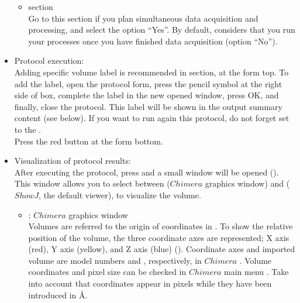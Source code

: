 \begin{itemize}
\begin{itemize}
  \item {} section\\
  
  Go to this section if you plan simultaneous data acquisition and processing, and select the option ``Yes''. By default, \scipion considers that you run your processes once you have finished data acquisition (option ``No'').\\
  
  \end{itemize}
  \item Protocol execution:\\
  
  Adding specific volume label is recommended in  section, at the form top. To add the label, open the protocol form, press the pencil symbol at the right side of  box, complete the label in the new opened window, press OK, and finally, close the protocol. This label will be shown in the output summary content (see below). If you want to run again this protocol, do not forget set to  the .\\
  Press the  red button at the form bottom.\\
  
  \item Visualization of protocol results:\\
  
  After executing the protocol, press  and a small window will be opened (). This window allows you to select between  ($Chimera$ graphics window) and  ($ShowJ$, the default \scipion viewer), to visualize the volume.
   
   \begin{itemize}
   \item {}: $Chimera$ graphics window\\
   
   Volumes are referred to the origin of coordinates in \chimera. To show the relative position of the volume, the three coordinate axes are represented; X axis (red), Y axis (yellow), and Z axis (blue) (). Coordinate axes and imported volume are model numbers  and , respectively, in $Chimera$ . Volume coordinates and pixel size can be checked in $Chimera$ main menu . Take into account that coordinates appear in pixels while they have been introduced in \AA.\\
   

\end{itemize}
\end{itemize}
